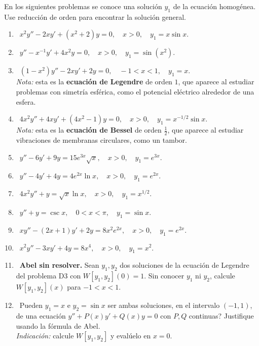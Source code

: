 \noindent En los siguientes problemas se conoce una soluci\'on $y_1$ de la ecuaci\'on homog\'enea. Use reducci\'on de orden para encontrar la soluci\'on general.

\begin{enumerate}[label=\textbf{D\arabic*.}, leftmargin=*]
    \item \facil\ $x^2y''-2xy'+(x^2+2)y=0,\quad x>0,\quad y_1=x\sin x$.
    \item \facil\ $y''-x^{-1}y'+4x^2y=0,\quad x>0,\quad y_1=\sin(x^2)$.
    \item \medio\ $(1-x^2)y''-2xy'+2y=0,\quad -1<x<1,\quad y_1=x$.\\
    \textit{Nota:} esta es la \textbf{ecuaci\'on de Legendre} de orden $1$, que aparece al estudiar problemas con simetr\'ia esf\'erica, como el potencial el\'ectrico alrededor de una esfera.
    \item \medio\ $4x^2y''+4xy'+(4x^2-1)y=0,\quad x>0,\quad y_1=x^{-1/2}\sin x$.\\
    \textit{Nota:} esta es la \textbf{ecuaci\'on de Bessel} de orden $\frac12$, que aparece al estudiar vibraciones de membranas circulares, como un tambor.
    \item \facil\ $y''-6y'+9y=15e^{3x}\sqrt{x},\quad x>0,\quad y_1=e^{3x}$.
    \item \facil\ $y''-4y'+4y=4e^{2x}\ln x,\quad x>0,\quad y_1=e^{2x}$.
    \item \medio\ $4x^2y''+y=\sqrt{x}\ln x,\quad x>0,\quad y_1=x^{1/2}$.
    \item \facil\ $y''+y=\csc x,\quad 0<x<\pi,\quad y_1=\sin x$.
    \item \medio\ $xy''-(2x+1)y'+2y=8x^2e^{2x},\quad x>0,\quad y_1=e^{2x}$.
    \item \facil\ $x^2y''-3xy'+4y=8x^4,\quad x>0,\quad y_1=x^2$.
    \item \medio\ \textbf{Abel sin resolver.} Sean $y_1,y_2$ dos soluciones de la ecuaci\'on de Legendre del problema D3 con $W[y_1,y_2](0)=1$. Sin conocer $y_1$ ni $y_2$, calcule $W[y_1,y_2](x)$ para $-1<x<1$.
    \item \dificil\ \textquestiondown Pueden $y_1=x$ e $y_2=\sin x$ ser ambas soluciones, en el intervalo $(-1,1)$, de una ecuaci\'on $y''+P(x)y'+Q(x)y=0$ con $P,Q$ continuas? Justifique usando la f\'ormula de Abel.\\
    \textit{Indicaci\'on:} calcule $W[y_1,y_2]$ y eval\'uelo en $x=0$.
\end{enumerate}


